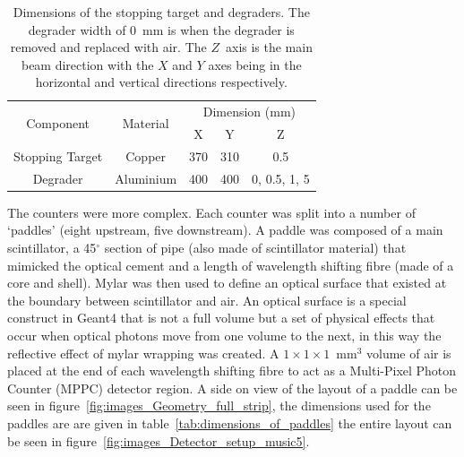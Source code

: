 \begin{table}
  \begin{center}
  \begin{tabular}{c | c | c | c | c}
    \multirow{2}{*}{Component}
                     &  \multirow{2}{*}{Material} 
                                   &  \multicolumn{3}{c}{Dimension (mm)}  \\
                     &             &   X   &   Y   &       Z       \\
    \hline
    Stopping Target  &  Copper     &  370  &  310  &      0.5      \\
    Degrader         &  Aluminium  &  400  &  400  & 0, 0.5, 1, 5  \\
    
  \end{tabular}
  \end{center}
  \caption{Dimensions of the stopping target and degraders. The degrader width of 0~mm is when the degrader is removed and replaced with air. The \(Z\)~axis is the main beam direction with the \(X\) and \(Y\) axes being in the horizontal and vertical directions respectively.}
  \label{tab:st_and_deg_dimensions}
\end{table}

The counters were more complex. Each counter was split into a number of `paddles' (eight upstream, five downstream). A paddle was composed of a main scintillator, a 45\(^{\circ}\) section of pipe (also made of scintillator material) that mimicked the optical cement and a length of wavelength shifting fibre (made of a core and shell). Mylar was then used to define an optical surface that existed at the boundary between scintillator and air. An optical surface is a special construct in Geant4 that is not a full volume but a set of physical effects that occur when optical photons move from one volume to the next, in this way the reflective effect of mylar wrapping was created. A \(1\times1\times1\)~mm\(^3\) volume of air is placed at the end of each wavelength shifting fibre to act as a Multi-Pixel Photon Counter (MPPC) detector region. A side on view of the layout of a paddle can be seen in figure~\ref{fig:images_Geometry_full_strip}, the dimensions used for the paddles are are given in table~\ref{tab:dimensions_of_paddles} the entire layout can be seen in figure~\ref{fig:images_Detector_setup_music5}. 


